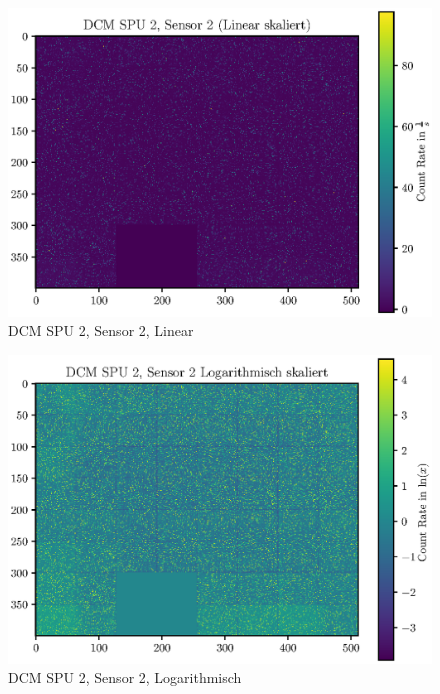 \documentclass[12pt,twoside,a4paper]{scrartcl}
\begin{document}
			\begin{figure}[H]
				\includegraphics[width = \textwidth]{Plots/DCM/DCM_SPU2_Sensor2_lin.eps}
				\caption{DCM SPU 2, Sensor 2, Linear}
			\end{figure}

			\begin{figure}[H]
				\includegraphics[width = \textwidth]{Plots/DCM/DCM_SPU2_Sensor2_log.eps}
				\caption{DCM SPU 2, Sensor 2, Logarithmisch}
			\end{figure}

			\newpage
\end{document}

